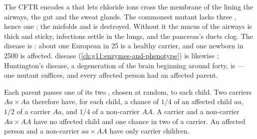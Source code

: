 \begin{example}\label{ex:g11:genes-and-disease:cf}
The CFTR  encodes a  that lets chloride ions cross the
membrane of the  lining the airways, the gut and the sweat
glands. The commonest mutant  lacks three , hence one
; the  misfolds and is destroyed. Without it the
mucus of the airways is thick and sticky, infections settle in the
lungs, and the pancreas's ducts clog. The disease is : about
one European in 25 is a healthy carrier, and one newborn in 2500 is
affected.  disease (\cref{ch:g11:enzymes-and-phenotype})
is likewise ; Huntington's disease, a degeneration of the
brain beginning around forty, is  --- one mutant 
suffices, and every affected person had an affected parent.
\end{example}

\begin{proposition}\label{prop:g11:genes-and-disease:recessive}
Each parent passes one of its two , chosen at random, to each
child. Two carriers $Aa \times Aa$ therefore have, for each child, a
chance of $1/4$ of an affected child $aa$, $1/2$ of a carrier $Aa$,
and $1/4$ of a non-carrier $AA$. A carrier and a non-carrier
$Aa \times AA$ have no affected child and one chance in two of a
carrier. An affected person and a non-carrier $aa \times AA$ have only
carrier children.
\end{proposition}
\admitted

